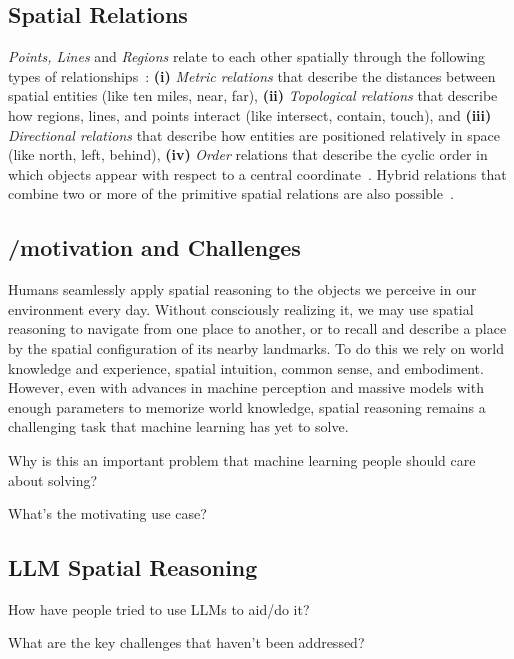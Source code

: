 \subsection{Spatial Relations}
\textit{Points, Lines} and \textit{Regions} relate to each other spatially through the following types of relationships~\cite{Carniel2020,Bertella2022,Carniel2023}: 
\textbf{(i)} \textit{Metric relations} that describe the distances between spatial entities (like ten miles, near, far), 
\textbf{(ii)} \textit{Topological relations} that describe how regions, lines, and points interact (like intersect, contain, touch), and 
\textbf{(iii)} \textit{Directional relations} that describe how entities are positioned relatively in space (like north, left, behind),
\textbf{(iv)} \textit{Order} relations that describe the cyclic order in which objects appear with respect to a central coordinate~\cite{Schwering2014}.
%
Hybrid relations that combine two or more of the primitive spatial relations are also possible~\cite{Carniel2023}.



\subsection{/motivation and Challenges}
Humans seamlessly apply spatial reasoning to the objects we perceive in our environment every day.
Without consciously realizing it, we may use spatial reasoning to navigate from one place to another, or to recall and describe a place by the spatial configuration of its nearby landmarks.
To do this we rely on world knowledge and experience, spatial intuition, common sense, and embodiment.
However, even with advances in machine perception and massive models with enough parameters to memorize world knowledge, spatial reasoning remains a challenging task that machine learning has yet to solve.


Why is this an important problem that machine learning people should care about solving?

What's the motivating use case?




\subsection{LLM Spatial Reasoning}
How have people tried to use LLMs to aid/do it?

What are the key challenges that haven't been addressed?
